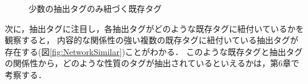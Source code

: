 \begin{figure}[H]
\begin{center}
\hspace*{-20pt}
\end{center}
\caption{少数の抽出タグのみ紐づく既存タグ}
\label{fig:NetworkLittle}
\end{figure}

次に，抽出タグに注目し，各抽出タグがどのような既存タグに紐付いているかを観察すると，
内容的な関係性の強い複数の既存タグに紐付いている抽出タグが存在する(図\ref{fig:NetworkSimilar})ことがわかる．	
このような既存タグと抽出タグの関係性から，どのような性質のタグが抽出されているといえるかは，第6章で考察する．

